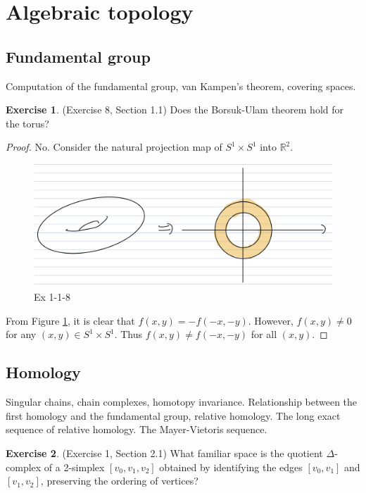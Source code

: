 \documentclass[12pt, psamsfonts]{amsart}
\theoremstyle{definition}
\newtheorem*{exer}{Exercise}
\theoremstyle{remark}
\numberwithin{equation}{section}
\begin{document}
\section{Algebraic topology}

\subsection{Fundamental group}
Computation of the fundamental group, van Kampen's theorem, covering spaces.

\begin{exer}{(Exercise 8, Section 1.1)}
  Does the Borsuk-Ulam theorem hold for the torus?
\end{exer}

\begin{proof}
  No.
  Consider the natural projection map of $S^1 \times S^1$ into $\mathbb{R}^2$.
  \begin{figure}[!htb]
    \includegraphics[width=.5\linewidth]{img/hatcher/ex-1-1-8.jpeg}
      \caption{Ex 1-1-8}
    \label{fig:ex_1_1_8}
  \end{figure}
  From Figure \ref{fig:ex_1_1_8}, it is clear that $f(x, y) = -f(-x, -y)$.
  However, $f(x, y) \ne 0$ for any $(x, y) \in S^1 \times S^1$.
  Thus $f(x, y) \ne f(-x, -y)$ for all $(x, y)$.
\end{proof}

\subsection{Homology}
Singular chains, chain complexes, homotopy invariance.
Relationship between the first homology and the fundamental group, relative homology.
The long exact sequence of relative homology.
The Mayer-Vietoris sequence.

\begin{exer}{(Exercise 1, Section 2.1)}
  What familiar space is the quotient $\Delta$-complex of a 2-simplex $[v_0, v_1, v_2]$ obtained by identifying the edges $[v_0, v_1]$ and $[v_1, v_2]$, preserving the ordering of vertices?
\end{exer}
\end{document}
